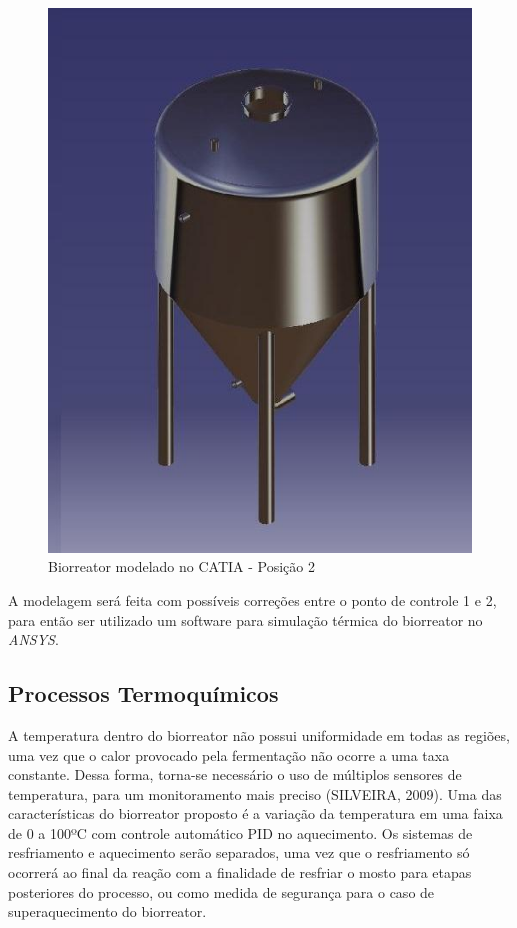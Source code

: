 \begin{figure}[h]
	\centering
	\includegraphics[keepaspectratio=true,scale=0.4]{figuras/catia2.eps}
	\caption{Biorreator modelado no CATIA - Posição 2}
	\label{catia2}
\end{figure}

A modelagem será feita com possíveis correções entre o ponto de controle 1 e 2, para então ser utilizado um software para simulação térmica do biorreator no  \textit{ANSYS}.

\subsection{Processos Termoquímicos}

A temperatura dentro do biorreator não possui uniformidade em todas as regiões, uma vez que o calor provocado pela fermentação não ocorre a uma taxa constante. Dessa forma, torna-se necessário o uso de múltiplos sensores de temperatura, para um monitoramento mais preciso (SILVEIRA, 2009). Uma das características do biorreator proposto é a variação da temperatura em uma faixa de 0 a 100ºC com controle automático PID no aquecimento. Os sistemas de resfriamento e aquecimento serão separados, uma vez que o resfriamento só ocorrerá ao final da reação com a finalidade de resfriar o mosto para etapas posteriores do processo, ou como medida de segurança para o caso de superaquecimento do biorreator.

